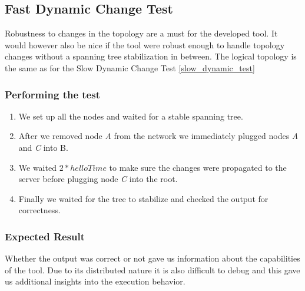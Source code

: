 \subsection*{Fast Dynamic Change Test}
\label{fast_dynamic_test}
Robustness to changes in the topology are a must for the developed tool.
It would however also be nice if the tool were robust enough to handle topology changes without a spanning tree stabilization in between.
The logical topology is the same as for the Slow Dynamic Change Test \ref{slow_dynamic_test}

\subsubsection*{Performing the test}
\begin{enumerate}
    \item We set up all the nodes and waited for a stable spanning tree.
    \item After we removed node \textit{A} from the network we immediately plugged nodes \textit{A} and \textit{C} into B.
    \item We waited $2*helloTime$ to make sure the changes were propagated to the server before plugging node \textit{C} into the root.
    \item Finally we waited for the tree to stabilize and checked the output for correctness.
\end{enumerate}

\subsubsection*{Expected Result}
Whether the output was correct or not gave us information about the capabilities of the tool.
Due to its distributed nature it is also difficult to debug and this gave us additional insights into the execution behavior.

